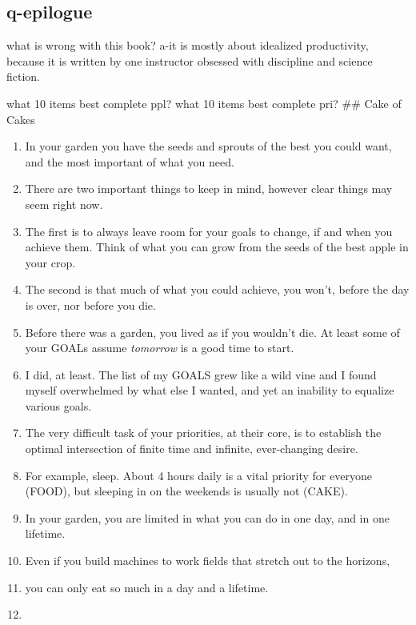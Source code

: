 \documentclass[
]{book}
\providecommand{\tightlist}{%
  \setlength{\itemsep}{0pt}\setlength{\parskip}{0pt}}
\begin{document}
\hypertarget{q-epilogue}{%
\subsection{q-epilogue}\label{q-epilogue}}

what is wrong with this book?
a-it is mostly about idealized productivity, because it is written by one instructor obsessed with discipline and science fiction.

what 10 items best complete ppl?
what 10 items best complete pri?
\#\# Cake of Cakes

\begin{enumerate}
\def\labelenumi{\arabic{enumi}.}
\tightlist
\item
  In your garden you have the seeds and sprouts of the best you could want, and the most important of what you need.
\item
  There are two important things to keep in mind, however clear things may seem right now.\\
\item
  The first is to always leave room for your goals to change, if and when you achieve them. Think of what you can grow from the seeds of the best apple in your crop.
\item
  The second is that much of what you could achieve, you won't, before the day is over, nor before you die.
\item
  Before there was a garden, you lived as if you wouldn't die. At least some of your GOALs assume \emph{tomorrow} is a good time to start.\\
\item
  I did, at least. The list of my GOALS grew like a wild vine and I found myself
  overwhelmed by what else I wanted, and yet an inability to equalize various
  goals.
\item
  The very difficult task of your priorities, at their core, is to establish the optimal intersection of finite time and infinite, ever-changing desire.
\item
  For example, sleep. About 4 hours daily is a vital priority for everyone (FOOD), but sleeping in on the weekends is usually not (CAKE).
\item
  In your garden, you are limited in what you can do in one day, and in one lifetime.
\item
  Even if you build machines to work fields that stretch out to the horizons,
\item
  you can only eat so much in a day and a lifetime.
\item

\end{enumerate}
\end{document}
